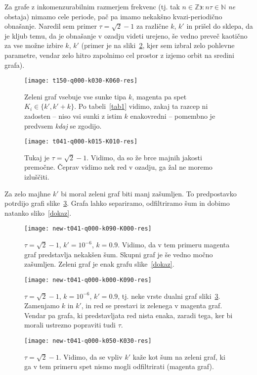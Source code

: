 \documentclass[a4paper, 12pt]{article}
\begin{document}
Za grafe z inkomenzurabilnim razmerjem frekvenc (tj. tak $n \in \mathbb{Z} \backepsilon: n\tau \in \mathbb{N}$ \emph{ne}
obstaja) nimamo cele periode, pa\v c pa imamo nekak\v sno kvazi-periodi\v cno obna\v sanje. Naredil sem primer
$\tau = \sqrt{2} - 1$ za razli\v cne $k$, $k'$ in pri\v sel do sklepa, da je kljub temu, da je obna\v sanje v ozadju videti
urejeno, \v se vedno preve\v c kaoti\v cno za vse mo\v zne izbire $k$, $k'$ (primer je na sliki~\ref{graf4}, kjer sem
izbral zelo pohlevne parametre, vendar zelo hitro zapolnimo cel prostor z izjemo orbit na sredini grafa).
\begin{landscape}
\begin{figure}[H]\centering
	\texttt{[image: t150-q000-k030-K060-res]}
	\caption{Zeleni graf vsebuje vse sunke tipa $k$, magenta pa spet $K_i \in \{k', k' + k\}$. Po tabeli~\ref{tab1}
		vidimo, zakaj ta razcep ni zadosten -- niso vsi sunki z istim $k$ enakovredni -- pomembno je predvsem
		\emph{kdaj} se zgodijo.}
	\label{graf3}
\end{figure}

\begin{figure}[H]\centering
	\texttt{[image: t041-q000-k015-K010-res]}
	\caption{Tukaj je $\tau = \sqrt{2}-1$. Vidimo, da so \v ze brce majnih jakosti premo\v cne. \v Ceprav vidimo nek
		red v ozadju, ga \v zal ne moremo izlu\v s\v citi.}
	\label{graf4}
\end{figure}

Za zelo majhne $k'$ bi moral zeleni graf biti manj za\v sumljen. To predpostavko potrdijo grafi slike~\ref{graf5}.
Grafa lahko separiramo, odfiltriramo \v sum in dobimo natanko sliko~\ref{dokaz}.
\begin{figure}[H]\centering
	\texttt{[image: new-t041-q000-k090-K000-res]}
	\caption{$\tau = \sqrt{2}-1$, $k' = 10^{-6}$, $k = 0.9$. Vidimo, da v tem primeru magenta graf predstavlja nekak\v sen
		\v sum. Skupni graf je \v se vedno mo\v cno za\v sumljen. Zeleni graf je enak grafu slike~\ref{dokaz}.}
	\label{graf5}
\end{figure}
\begin{figure}[H]\centering
	\texttt{[image: new-t041-q000-k000-K090-res]}
	\caption{$\tau = \sqrt{2}-1$, $k = 10^{-6}$, $k' = 0.9$, tj. neke vrste dualni graf sliki~\ref{graf5}. Zamenjamo
		$k$ in $k'$, in red se prestavi iz zelenega v magenta graf. Vendar pa grafa, ki predstavljata red nista
		enaka, zaradi tega, ker bi morali ustrezno popraviti tudi $\tau$.}
	\label{graf5a}
\end{figure}
\begin{figure}[H]\centering
	\texttt{[image: new-t041-q000-k050-K030-res]}
	\caption{$\tau = \sqrt{2}-1$. Vidimo, da se vpliv $k'$ ka\v ze kot \v sum na zeleni graf, ki ga v tem primeru spet
		nismo mogli odfiltrirati (magenta graf).}
	\label{graf5b}
\end{figure}
\end{landscape}
\end{document}
